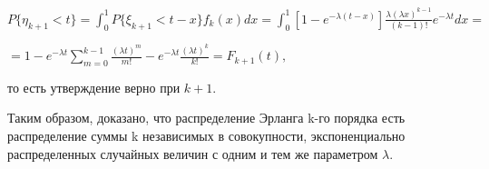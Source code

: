 \begin{center}
	
	  $P\{\eta_{k+1}<t\} = \int_{0}^{1}P\{\xi_{k+1}<t-x\}f_k(x)dx = \int_{0}^{1}[1-e^{-\lambda(t-x)}]\frac{\lambda(\lambda x)^{k-1}}{(k-1)!}e^{-\lambda t}dx=$
\end{center}
\begin{center}
	  $= 1-e^{-\lambda t} \sum_{m=0}^{k-1}\frac{(\lambda t)^m}{m!} - e^{-\lambda
	   t}{\frac{(\lambda t)^k}{k!}} = F_{k+1}(t),$
\end{center}
  
  то есть утверждение верно при $k+1$. 
  
  Таким образом, доказано, что распределение Эрланга k-го порядка есть распределение суммы k независимых в совокупности, экспоненциально распределенных случайных величин с одним и тем же параметром $\lambda$.
  
\newpage

